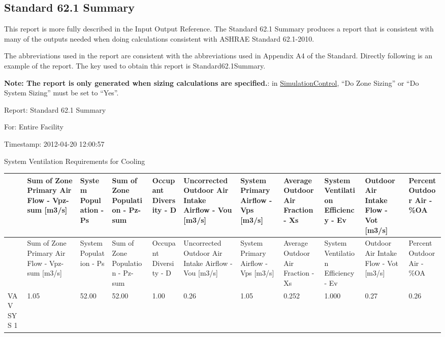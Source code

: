 \subsection{Standard 62.1 Summary}\label{standard-62.1-summary}

This report is more fully described in the Input Output Reference. The Standard 62.1 Summary produces a report that is consistent with many of the outputs needed when doing calculations consistent with ASHRAE Standard 62.1-2010.

The abbreviations used in the report are consistent with the abbreviations used in Appendix A4 of the Standard. Directly following is an example of the report. The key used to obtain this report is Standard62.1Summary.

\textbf{Note: The report is only generated when sizing calculations are specified.}: in \hyperref[simulationcontrol]{SimulationControl}, ``Do Zone Sizing'' or ``Do System Sizing'' must be set to ``Yes''.

Report: Standard 62.1 Summary

For: Entire Facility

Timestamp: 2012-04-20 12:00:57

System Ventilation Requirements for Cooling

{\scriptsize
\begin{longtable}[c]{>{\raggedright}p{0.54in}>{\raggedright}p{0.54in}>{\raggedright}p{0.54in}>{\raggedright}p{0.54in}>{\raggedright}p{0.54in}>{\raggedright}p{0.54in}>{\raggedright}p{0.54in}>{\raggedright}p{0.54in}>{\raggedright}p{0.54in}>{\raggedright}p{0.54in}>{\raggedright}p{0.54in}}
\toprule 
 & Sum of Zone Primary Air Flow - Vpz-sum [m3/s] & System Population - Ps & Sum of Zone Population - Pz-sum & Occupant Diversity - D & Uncorrected Outdoor Air Intake Airflow - Vou [m3/s] & System Primary Airflow - Vps [m3/s] & Average Outdoor Air Fraction - Xs & System Ventilation Efficiency - Ev & Outdoor Air Intake Flow - Vot [m3/s] & Percent Outdoor Air - \%OA \tabularnewline
\midrule
\endfirsthead

\toprule 
 & Sum of Zone Primary Air Flow - Vpz-sum [m3/s] & System Population - Ps & Sum of Zone Population - Pz-sum & Occupant Diversity - D & Uncorrected Outdoor Air Intake Airflow - Vou [m3/s] & System Primary Airflow - Vps [m3/s] & Average Outdoor Air Fraction - Xs & System Ventilation Efficiency - Ev & Outdoor Air Intake Flow - Vot [m3/s] & Percent Outdoor Air - \%OA \tabularnewline
\midrule
\endhead

VAV SYS 1 & 1.05 & 52.00 & 52.00 & 1.00 & 0.26 & 1.05 & 0.252 & 1.000 & 0.27 & 0.26 \tabularnewline
\bottomrule
\end{longtable}}

